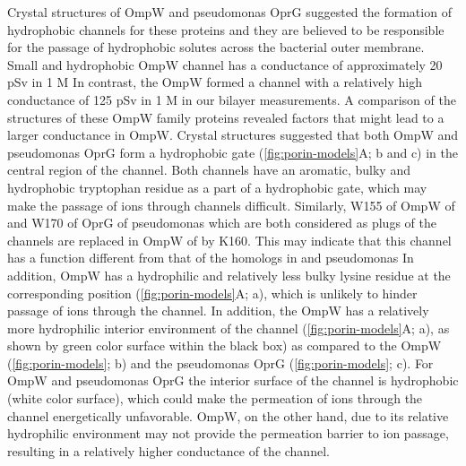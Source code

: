 Crystal structures of \ecoli OmpW and \ac{pseudomonas} OprG suggested the formation of hydrophobic channels for these proteins and they are believed to be responsible for the passage of hydrophobic solutes across the bacterial outer membrane. Small and hydrophobic \ecoli OmpW channel has a conductance of approximately 20 \si{\pico\sievert} in 1 M  In contrast, the \caulobacter OmpW formed a channel with a relatively high conductance of 125 \si{\pico\sievert} in 1 M  in our bilayer measurements. A comparison of the structures of these OmpW family proteins revealed factors that might lead to a larger conductance in \caulobacter OmpW. Crystal structures suggested that both \ecoli OmpW and \ac{pseudomonas} OprG form a hydrophobic gate (\cref{fig:porin-models}A; b and c) in the central region of the channel. Both channels have an aromatic, bulky and hydrophobic tryptophan residue as a part of a hydrophobic gate, which may make the passage of ions through channels difficult. Similarly, W155 of OmpW of \ecoli{} and W170 of OprG of \ac{pseudomonas} which are both considered as plugs of the channels are replaced in OmpW of \caulobacter by K160. This may indicate that this channel has a function different from that of the homologs in \ecoli and \ac{pseudomonas} In addition, \caulobacter OmpW has a hydrophilic and relatively less bulky lysine residue at the corresponding position (\cref{fig:porin-models}A; a), which is unlikely to hinder passage of ions through the channel. In addition, the \caulobacter OmpW has a relatively more hydrophilic interior environment of the channel (\cref{fig:porin-models}A; a), as shown by green color surface within the black box) as compared to the \ecoli OmpW (\cref{fig:porin-models}; b) and the  \ac{pseudomonas} OprG (\cref{fig:porin-models}; c). For \ecoli OmpW and \ac{pseudomonas} OprG the interior surface of the channel is hydrophobic (white color surface), which could make the permeation of ions through the channel energetically unfavorable. \caulobacter OmpW, on the other hand, due to its relative hydrophilic environment may not provide the permeation barrier to ion passage, resulting in a relatively higher conductance of the channel. 

